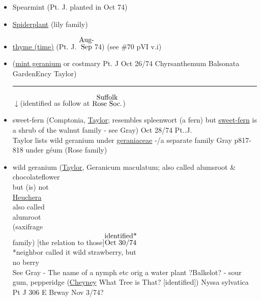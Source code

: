 \documentclass[a4paper,10pt]{article}
\begin{document}
\begin{flushleft}
\begin{itemize}
\color{blue}
\normalsize
Oct 18/74
\small
\color{red}
John Parkinson 1629 \ul{Paradisus Terrestis} ``The rarity \& novelty of this herb, being for the most part but in the gardens of great persons, doth cause it to be of great regard"
\color{blue}
\normalsize
\item Spearmint (Pt. J. planted in Oct 74)
\item \ul{Spiderplant} (lily family)
\item \ul{thyme (time)} (Pt. J. {$\stackrel{\hbox{Aug-}}{\hbox{Sep}}$}74) (see \#70 pVI v.i)
\item (\ul{mint geranium} or costmary Pt. J Oct 26/74 
Chyrsanthemum Balsonata GardenEncy Taylor)
\rule{10cm}{0.01cm}
\begin{flushright}
$\downarrow$(identified as follow at {$\stackrel{\hbox{Suffolk}}{\hbox{Rose Soc.}}$})
\end{flushright}
\item sweet-fern (Comptonia, \ul{Taylor}; resembles spleenwort (a fern) but \ul{sweet-fern} is a shrub of the walnut family - see Gray)
Oct 28/74 Pt..J.\\
\color{red}
\footnotesize
Taylor lists wild geranium under \ul{geraniaceae} -/a separate family 
Gray p817-818 %
under g\'eum (Rose family)
\color{blue}
\normalsize
\item wild geranium (\ul{Taylor}, Geranicum maculatum; also called alumsroot \& chocolateflower\\
\color{red}
but (is) not\\
\ul{Heuchera}\\
also called\\
 alumroot\\
(saxifrage\\
family)
\color{blue}
[the relation to those]{$\stackrel{\hbox{identified*}}{\hbox{Oct 30/74}}$}\\
*neighbor called it wild strawberry, but\\ 
no berry\\
See Gray - The name of a nymph etc orig a water plant 
?Balkelot? - sour gum, pepperidge \color{red} (\ul{Cheyney} What Tree is That? [identified])
\color{blue}Nyssa sylvatica Pt J 306 E Brway Nov 3/74?



\end{itemize}
\end{flushleft}
\end{document}
